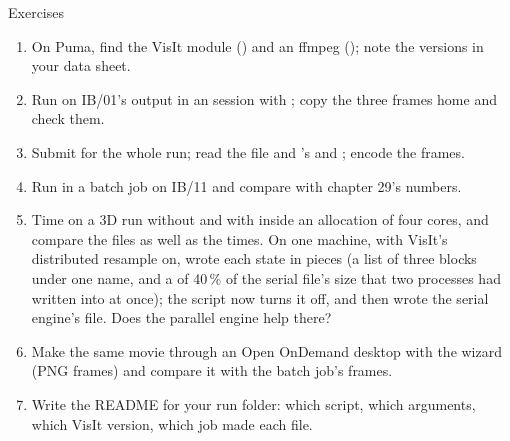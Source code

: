 \documentclass[aspectratio=169,11pt]{beamer}
\begin{document}
\begin{frame}{Exercises}
\label{fr:exercises}
\footnotesize
\begin{enumerate}\setlength{\itemsep}{1pt}
  \item On Puma, find the VisIt module () and an ffmpeg (); note the versions in your data sheet.
  \item Run  on IB/01's output in an  session with ; copy the three frames home and check them.
  \item Submit  for the whole run; read the  file and 's  and ; encode the frames.
  \item Run  in a batch job on IB/11 and compare  with chapter 29's numbers.
  \item Time  on a 3D run without  and with  inside an allocation of four cores, and compare the files as well as the times. On one machine, with VisIt's distributed resample on,  wrote each state in pieces (a  list of three blocks under one name, and a  of 40\,\% of the serial file's size that two processes had written into at once); the script now turns it off, and  then wrote the serial engine's file. Does the parallel engine help there?
  \item Make the same movie through an Open OnDemand desktop with the wizard (PNG frames) and compare it with the batch job's frames.
  \item Write the README for your run folder: which script, which arguments, which VisIt version, which job made each file.
\end{enumerate}
\end{frame}
\end{document}
